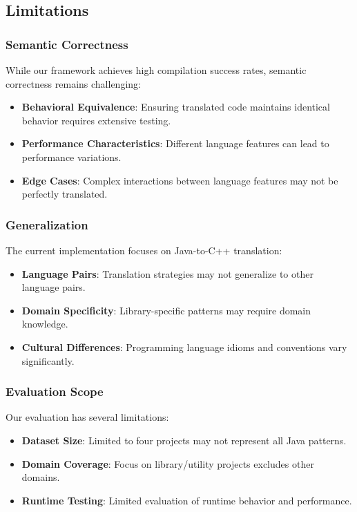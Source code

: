 \subsection{Limitations}

\subsubsection{Semantic Correctness}
While our framework achieves high compilation success rates, semantic correctness remains challenging:

\begin{itemize}
\item \textbf{Behavioral Equivalence}: Ensuring translated code maintains identical behavior requires extensive testing.
\item \textbf{Performance Characteristics}: Different language features can lead to performance variations.
\item \textbf{Edge Cases}: Complex interactions between language features may not be perfectly translated.
\end{itemize}

\subsubsection{Generalization}
The current implementation focuses on Java-to-C++ translation:

\begin{itemize}
\item \textbf{Language Pairs}: Translation strategies may not generalize to other language pairs.
\item \textbf{Domain Specificity}: Library-specific patterns may require domain knowledge.
\item \textbf{Cultural Differences}: Programming language idioms and conventions vary significantly.
\end{itemize}

\subsubsection{Evaluation Scope}
Our evaluation has several limitations:

\begin{itemize}
\item \textbf{Dataset Size}: Limited to four projects may not represent all Java patterns.
\item \textbf{Domain Coverage}: Focus on library/utility projects excludes other domains.
\item \textbf{Runtime Testing}: Limited evaluation of runtime behavior and performance.
\end{itemize}

